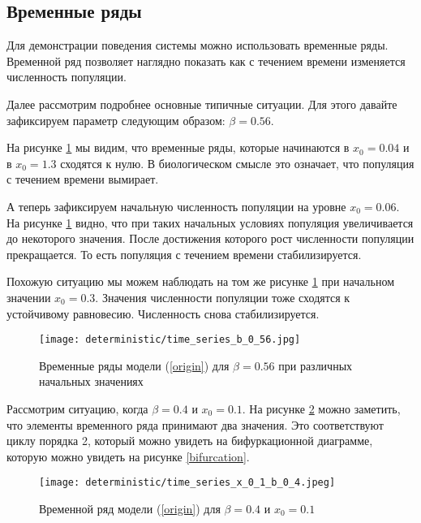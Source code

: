 \subsection{Временные ряды}

    Для демонстрации поведения системы можно использовать временные ряды. Временной ряд позволяет наглядно показать как с течением времени изменяется численность популяции.

    Далее рассмотрим подробнее основные типичные ситуации. Для этого давайте зафиксируем параметр следующим образом: \(\beta = 0.56\). 

    На рисунке \ref{time_series_b_0_56} мы видим, что временные ряды, которые начинаются в \(x_0 = 0.04\) и в \(x_0 = 1.3\) сходятся к нулю. В биологическом смысле это означает, что популяция с течением времени вымирает.

    А теперь зафиксируем начальную численность популяции на уровне \(x_0 = 0.06\). На рисунке \ref{time_series_b_0_56} видно, что при таких начальных условиях популяция увеличивается до некоторого значения. После достижения которого рост численности популяции прекращается. То есть популяция с течением времени стабилизируется.

    Похожую ситуацию мы можем наблюдать на том же рисунке \ref{time_series_b_0_56} при начальном значении \(x_0 = 0.3\). Значения численности популяции тоже сходятся к устойчивому равновесию. Численность снова стабилизируется.
    
    \begin{figure}
        \centering
        \texttt{[image: deterministic/time\_series\_b\_0\_56.jpg]}

        \captionsetup{justification=centering}
        \caption{Временные ряды модели (\ref{origin}) для \(\beta = 0.56\) при различных начальных значениях}
        \label{time_series_b_0_56}
    \end{figure}

    Рассмотрим ситуацию, когда \(\beta = 0.4\) и \(x_0 = 0.1\). На рисунке \ref{time_series_x_0_1_b_0_4} можно заметить, что элементы временного ряда принимают два значения. Это соответствуют циклу порядка 2, который можно увидеть на бифуркационной диаграмме, которую можно увидеть на рисунке \ref{bifurcation}.
    
    \begin{figure}
        \centering
        \texttt{[image: deterministic/time\_series\_x\_0\_1\_b\_0\_4.jpeg]}

        \captionsetup{justification=centering}
        \caption{Временной ряд модели (\ref{origin}) для \(\beta = 0.4\) и \(x_0 = 0.1\)}
        \label{time_series_x_0_1_b_0_4}
    \end{figure}


